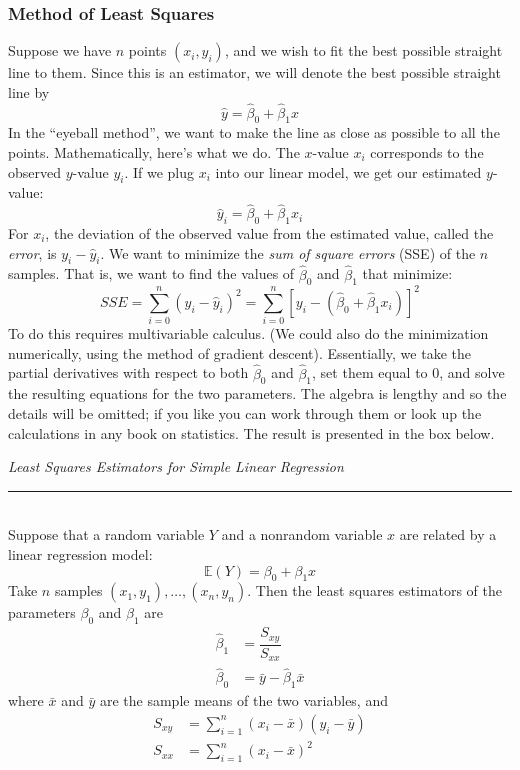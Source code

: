 \documentclass[12pt]{article}
\theoremstyle{definition}
\theoremstyle{remark}
\def\E{{\mathbb E}}
\begin{document}
\subsubsection{Method of Least Squares}
Suppose we have $n$ points $(x_i, y_i)$, and we wish to fit the best possible straight line to them. Since this is an estimator, we will denote the best possible straight line by
\[
\hat{y} = \hat{\beta}_0 + \hat{\beta}_1 x
\]
In the ``eyeball method'', we want to make the line as close as possible to all the points. Mathematically, here's what we do. The $x$-value $x_i$ corresponds to the observed $y$-value $y_i$. If we plug $x_i$ into our linear model, we get our estimated $y$-value:
\[
\hat{y}_i = \hat{\beta}_0 + \hat{\beta}_1 x_i
\]
For $x_i$, the deviation of the observed value from the estimated value, called the \emph{error}, is $y_i - \hat{y}_i$. We want to minimize the \emph{sum of square errors} (SSE) of the $n$ samples. That is, we want to find the values of $\hat{\beta}_0$ and $\hat{\beta}_1$ that minimize:
\[
SSE = \sum_{i=0}^n (y_i - \hat{y}_i)^2 = \sum_{i=0}^n \left[ y_i - (\hat{\beta}_0 + \hat{\beta}_1 x_i) \right]^2 
\]
To do this requires multivariable calculus. (We could also do the minimization numerically, using the method of gradient descent). Essentially, we take the partial derivatives with respect to both $\hat{\beta}_0$ and $\hat{\beta}_1$, set them equal to 0, and solve the resulting equations for the two parameters. The algebra is lengthy and so the details will be omitted; if you like you can work through them or look up the calculations in any book on statistics. The result is presented in the box below.

\begin{framed}
  \emph{Least Squares Estimators for Simple Linear Regression }\\
  \rule{\dimexpr{}\fboxrule}{.1pt} \\
Suppose that a random variable $Y$ and a nonrandom variable $x$ are related by a linear regression model:
\[
\E(Y) = \beta_0 + \beta_1 x
\]
Take $n$ samples $(x_1, y_1), \dots, (x_n, y_n)$. Then the least squares estimators of the parameters $\beta_0$ and $\beta_1$ are
\begin{align*}
\hat{\beta}_1 &= \dfrac{S_{xy}}{S_{xx}}\\
\hat{\beta}_0 &= \bar{y} - \hat{\beta}_1 \bar{x}
\end{align*}
where $\bar{x}$ and $\bar{y}$ are the sample means of the two variables, and
\begin{align*}
S_{xy} &= \sum_{i=1}^n (x_i - \bar{x})(y_i - \bar{y}) \\
S_{xx} &= \sum_{i=1}^n (x_i - \bar{x})^2
\end{align*}
\end{framed}
\end{document}
